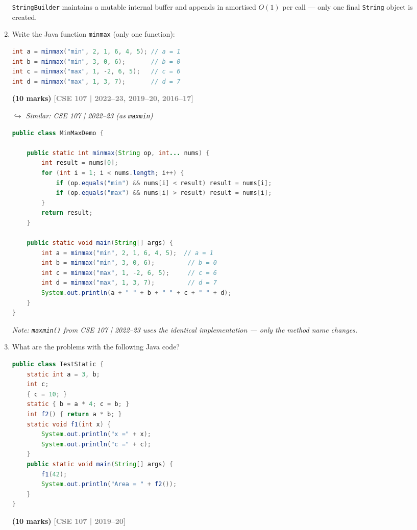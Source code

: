 \documentclass[12pt,a3paper]{article}
\newcommand{\yr}[1]{\hfill\textcolor{gray}{\small\textbf{[#1]}}}
\newcommand{\mk}[1]{\textcolor{orange!70!black}{\small\textbf{(#1 marks)}}}
\newcommand{\variant}[1]{\par\vspace{1pt}\textcolor{blue!50!black}%
  {\footnotesize\textit{$\hookrightarrow$ Similar: #1}}}
\begin{document}
\begin{enumerate}
\begin{tcolorbox}
\texttt{StringBuilder} maintains a mutable internal buffer and
appends in amortised $O(1)$ per call --- only one final
\texttt{String} object is created.

\end{tcolorbox}

\item Write the Java function \texttt{minmax} (only one function):
\begin{lstlisting}[language=Java]
int a = minmax("min", 2, 1, 6, 4, 5); // a = 1
int b = minmax("min", 3, 0, 6);       // b = 0
int c = minmax("max", 1, -2, 6, 5);   // c = 6
int d = minmax("max", 1, 3, 7);       // d = 7
\end{lstlisting}
\mk{10}
\yr{CSE 107 | 2022--23, 2019--20, 2016--17}
\variant{CSE 107 | 2022--23 (as \texttt{maxmin})}

\begin{tcolorbox}[enhanced,breakable,ansbox,
  colback=cB!4,colframe=cB,boxrule=0.8pt,arc=5pt,
  title={\textbf{Answer --- \texttt{minmax()} with Varargs}},
  fonttitle=\bfseries\color{white},colbacktitle=cB]

\begin{lstlisting}[language=Java]
public class MinMaxDemo {

    public static int minmax(String op, int... nums) {
        int result = nums[0];
        for (int i = 1; i < nums.length; i++) {
            if (op.equals("min") && nums[i] < result) result = nums[i];
            if (op.equals("max") && nums[i] > result) result = nums[i];
        }
        return result;
    }

    public static void main(String[] args) {
        int a = minmax("min", 2, 1, 6, 4, 5);  // a = 1
        int b = minmax("min", 3, 0, 6);         // b = 0
        int c = minmax("max", 1, -2, 6, 5);     // c = 6
        int d = minmax("max", 1, 3, 7);         // d = 7
        System.out.println(a + " " + b + " " + c + " " + d);
    }
}
\end{lstlisting}

\textit{Note: \texttt{maxmin()} from CSE 107 | 2022--23 uses the
identical implementation --- only the method name changes.}

\end{tcolorbox}


\item What are the problems with the following Java code?
\begin{lstlisting}[language=Java]
public class TestStatic {
    static int a = 3, b;
    int c;
    { c = 10; }
    static { b = a * 4; c = b; }
    int f2() { return a * b; }
    static void f1(int x) {
        System.out.println("x =" + x);
        System.out.println("c =" + c);
    }
    public static void main(String[] args) {
        f1(42);
        System.out.println("Area = " + f2());
    }
}
\end{lstlisting}
\mk{10}
\yr{CSE 107 | 2019--20}


\end{enumerate}
\end{document}
